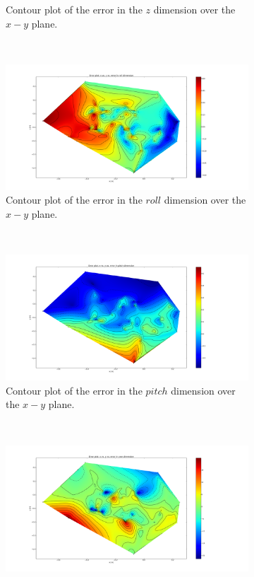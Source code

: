 \begin{figure}
\begin{subfigure}{0.31\textwidth}
    \caption{Contour plot of the error in the $z$ dimension over the $x-y$ plane.}
  \end{subfigure}
~
  \begin{subfigure}{0.31\textwidth}
    \includegraphics[clip, trim = 200 50 300 50, width=\textwidth]{figures/chapter3/contour_roll}
    \caption{Contour plot of the error in the $roll$ dimension over the $x-y$ plane.}
  \end{subfigure}
~
  \begin{subfigure}{0.31\textwidth}
    \includegraphics[clip, trim = 200 50 300 50, width=\textwidth]{figures/chapter3/contour_pitch}
    \caption{Contour plot of the error in the $pitch$ dimension over the $x-y$ plane.}
  \end{subfigure}
~
  \begin{subfigure}{0.31\textwidth}
    \includegraphics[clip, trim = 200 50 300 50, width=\textwidth]{figures/chapter3/contour_yaw}

\end{subfigure}
\end{figure}
